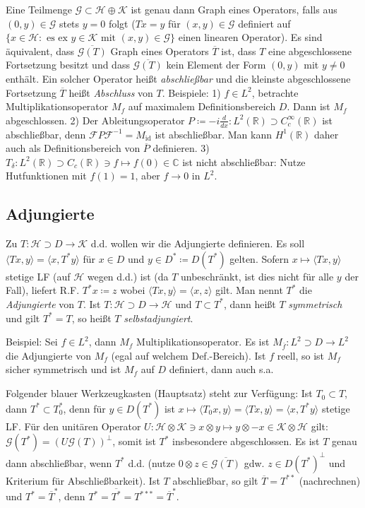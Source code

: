 \documentclass[11pt,a4paper]{scrartcl}
\newcommand{\R}{\mathbb{R}} %
\newcommand{\C}{\mathbb{C}} %
\newcommand{\Hc}{\mathcal{H}}
\newcommand{\Kc}{\mathcal{K}}
\newcommand{\G}{\mathcal{G}}
\newcommand{\F}{\mathcal{F}}
\theoremstyle{plain}
\theoremstyle{definition}
\theoremstyle{remark}
\DeclareMathOperator{\id}{id}
\begin{document}
Eine Teilmenge $\G \subset \Hc \oplus \Kc$ ist genau dann Graph eines Operators, falls aus $(0,y)\in \G$ stets $y=0$ folgt ($Tx=y$ für $(x,y)\in \G$ definiert auf $\{x\in \Hc: \text{ es ex } y\in \Kc \text{ mit } (x,y)\in \G\}$ einen linearen Operator). Es sind äquivalent, dass $\overline{\G(T)}$ Graph eines Operators $\overline{T}$ ist, dass $T$ eine abgeschlossene Fortsetzung besitzt und dass $\overline{\G(T)}$ kein Element der Form $(0,y)$ mit $y\neq 0$ enthält. Ein solcher Operator heißt \emph{abschließbar} und die kleinste abgeschlossene Fortsetzung $\overline{T}$ heißt \emph{Abschluss} von $T$. Beispiele: 1) $f\in L^2$, betrachte Multiplikationsoperator $M_f$ auf maximalem Definitionsbereich $D$. Dann ist $M_f$ abgeschlossen. 2) Der Ableitungsoperator $P\coloneqq -i \frac{d}{dx}: L^2(\R) \supset C_c^\infty(\R)$ ist abschließbar, denn $\F P\F^{-1} = M_{\id}$ ist abschließbar. Man kann $H^1(\R)$ daher auch als Definitionsbereich von $\overline{P}$ definieren. 3) $T_\delta: L^2(\R) \supset C_c(\R) \ni f \mapsto f(0) \in \C$ ist nicht abschließbar: Nutze Hutfunktionen mit $f(1)=1$, aber $f\to 0$ in $L^2$.

\subsection{Adjungierte}

Zu $T:\Hc \supset D \to \Kc$ d.d. wollen wir die Adjungierte definieren. Es soll $\langle Tx,y \rangle = \langle x, T^*y \rangle$ für $x\in D$ und $y\in D^*\coloneqq D(T^*)$ gelten. Sofern $x\mapsto \langle Tx, y \rangle$ stetige LF (auf $\Hc$ wegen d.d.) ist (da $T$ unbeschränkt, ist dies nicht für alle $y$ der Fall), liefert R.F. $T^*x\coloneqq z$ wobei $\langle Tx,y \rangle = \langle x, z \rangle$ gilt. Man nennt $T^*$ die \emph{Adjungierte} von $T$. Ist $T: \Hc \supset D \to \Hc$ und $T \subset T^*$, dann heißt $T$ \emph{symmetrisch} und gilt $T^*=T$, so heißt $T$ \emph{selbstadjungiert}. 

Beispiel: Sei $f\in L^2$, dann $M_f$ Multiplikationsoperator. Es ist $M_{\overline{f}}: L^2 \supset D \to L^2$ die Adjungierte von $M_f$ (egal auf welchem Def.-Bereich). Ist $f$ reell, so ist $M_f$ sicher symmetrisch und ist $M_f$ auf $D$ definiert, dann auch s.a.

Folgender blauer Werkzeugkasten (Hauptsatz) steht zur Verfügung: Ist $T_0 \subset T$, dann $T^* \subset T_0^*$, denn für $y\in D(T^*)$ ist $x\mapsto \langle T_0 x, y \rangle = \langle Tx, y\rangle = \langle x, T^* y \rangle$ stetige LF. Für den unitären Operator $U: \Hc \otimes \Kc \ni x \otimes y \mapsto y \otimes -x \in \Kc \otimes \Hc$ gilt: $\G(T^*) = (U\G(T))^\perp$, somit ist $T^*$ insbesondere abgeschlossen. Es ist $T$ genau dann abschließbar, wenn $T^*$ d.d. (nutze $0\otimes z \in \overline{\G(T)}$ gdw. $z\in D(T^*)^\perp$ und Kriterium für Abschließbarkeit). Ist $T$ abschließbar, so gilt $\overline{T} = T^{**}$ (nachrechnen) und $T^* = \overline{T}^*$, denn $T^*=\overline{T^*}=T^{***}=\overline{T}^*$.
\end{document}
